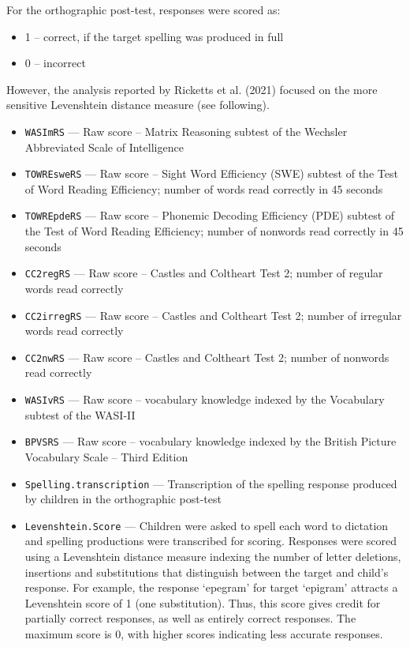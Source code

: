 \documentclass[
  letterpaper,
  DIV=11,
  numbers=noendperiod]{scrreprt}
\providecommand{\tightlist}{%
  \setlength{\itemsep}{0pt}\setlength{\parskip}{0pt}}\usepackage{longtable,booktabs,array}
\begin{document}
For the orthographic post-test, responses were scored as:

\begin{itemize}
\tightlist
\item
  1 -- correct, if the target spelling was produced in full
\item
  0 -- incorrect
\end{itemize}

However, the analysis reported by Ricketts et al. (2021) focused on the
more sensitive Levenshtein distance measure (see following).

\begin{itemize}
\tightlist
\item
  \texttt{WASImRS} --- Raw score -- Matrix Reasoning subtest of the
  Wechsler Abbreviated Scale of Intelligence
\item
  \texttt{TOWREsweRS} --- Raw score -- Sight Word Efficiency (SWE)
  subtest of the Test of Word Reading Efficiency; number of words read
  correctly in 45 seconds
\item
  \texttt{TOWREpdeRS} --- Raw score -- Phonemic Decoding Efficiency
  (PDE) subtest of the Test of Word Reading Efficiency; number of
  nonwords read correctly in 45 seconds
\item
  \texttt{CC2regRS} --- Raw score -- Castles and Coltheart Test 2;
  number of regular words read correctly
\item
  \texttt{CC2irregRS} --- Raw score -- Castles and Coltheart Test 2;
  number of irregular words read correctly
\item
  \texttt{CC2nwRS} --- Raw score -- Castles and Coltheart Test 2; number
  of nonwords read correctly
\item
  \texttt{WASIvRS} --- Raw score -- vocabulary knowledge indexed by the
  Vocabulary subtest of the WASI-II
\item
  \texttt{BPVSRS} --- Raw score -- vocabulary knowledge indexed by the
  British Picture Vocabulary Scale -- Third Edition
\item
  \texttt{Spelling.transcription} --- Transcription of the spelling
  response produced by children in the orthographic post-test
\item
  \texttt{Levenshtein.Score} --- Children were asked to spell each word
  to dictation and spelling productions were transcribed for scoring.
  Responses were scored using a Levenshtein distance measure indexing
  the number of letter deletions, insertions and substitutions that
  distinguish between the target and child's response. For example, the
  response `epegram' for target `epigram' attracts a Levenshtein score
  of 1 (one substitution). Thus, this score gives credit for partially
  correct responses, as well as entirely correct responses. The maximum
  score is 0, with higher scores indicating less accurate responses.
\end{itemize}
\end{document}
